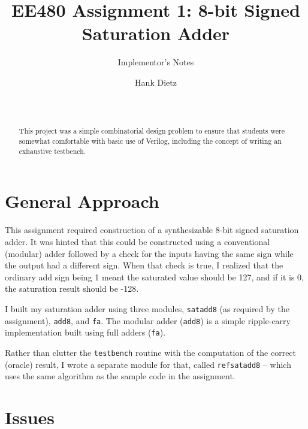 \documentclass{sig-alternate-05-2015}
\begin{document}

\title{EE480 Assignment 1: 8-bit Signed Saturation Adder}
\subtitle{Implementor's Notes}

\author{
Hank Dietz\\
       \\
       \\
}

\maketitle
\begin{abstract}
This project was a simple combinatorial design problem to
ensure that students were somewhat comfortable with basic use of
Verilog, including the concept of writing an exhaustive testbench.
\end{abstract}


\section{General Approach}

This assignment required construction of a synthesizable 8-bit
signed saturation adder.  It was hinted that this could be
constructed using a conventional (modular) adder followed by a
check for the inputs having the same sign while the output had a
different sign.  When that check is true, I realized that the
ordinary add sign being 1 meant the saturated value should be
127, and if it is 0, the saturation result should be -128.

I built my saturation adder using three modules,
\texttt{satadd8} (as required by the assignment), \texttt{add8},
and \texttt{fa}.  The modular adder (\texttt{add8}) is a simple
ripple-carry implementation built using full adders
(\texttt{fa}).

Rather than clutter the \texttt{testbench} routine with the
computation of the correct (oracle) result, I wrote a separate
module for that, called \texttt{refsatadd8} -- which uses the
same algorithm as the sample code in the assignment.

\vfill\pagebreak

\section{Issues}
\end{document}
